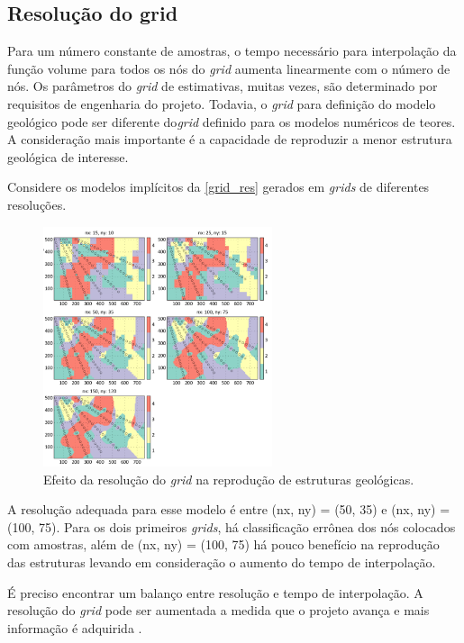 \subsection{Resolução do grid}

Para um número constante de amostras, o tempo necessário para interpolação da função volume para todos os nós do \textit{grid} aumenta linearmente com o número de nós. Os parâmetros do \textit{grid} de estimativas, muitas vezes, são determinado por requisitos de engenharia do projeto. Todavia, o \textit{grid} para definição do modelo geológico pode ser diferente do\textit{grid} definido para os modelos numéricos de teores. A consideração mais importante é a capacidade de reproduzir a menor estrutura geológica de interesse.

Considere os modelos implícitos da \autoref{grid_res} gerados em \textit{grids} de diferentes resoluções.

\begin{figure}[H]
	\caption{\label{grid_res}Efeito da resolução do \textit{grid} na reprodução de estruturas geológicas.}
	\begin{center}
		\includegraphics[width=0.6\textwidth]{capitulo_2/grid_res.png}
	\end{center}
\end{figure}

A resolução adequada para esse modelo é entre (nx, ny) = (50, 35) e (nx, ny) = (100, 75). Para os dois primeiros \textit{grids}, há classificação errônea dos nós colocados com amostras, além de (nx, ny) = (100, 75) há pouco benefício na reprodução das estruturas levando em consideração o aumento do tempo de interpolação.

É preciso encontrar um balanço entre resolução e tempo de interpolação. A resolução do \textit{grid} pode ser aumentada a medida que o projeto avança e mais informação é adquirida \cite{martin2017implicitmodeling}.

